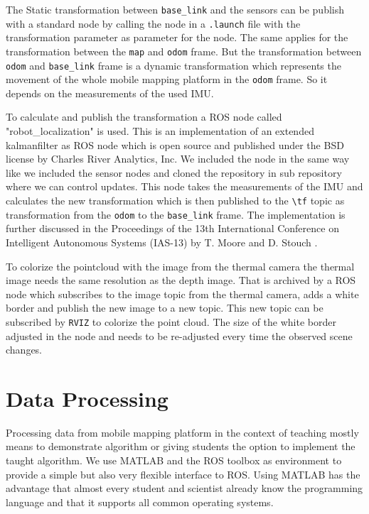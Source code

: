 The Static transformation between \texttt{base\_link} and the sensors can be publish with a standard node by calling the node in a \texttt{.launch} file with the transformation parameter as parameter for the node. 
The same applies for the transformation between the \texttt{map} and \texttt{odom} frame.
But the transformation between \texttt{odom} and \texttt{base\_link} frame is a dynamic transformation which represents the movement of the whole mobile mapping platform in the \texttt{odom} frame.
So it depends on the measurements of the used IMU\@.

To calculate and publish the transformation a ROS node called "robot\_localization" is used.
This is an implementation of an extended kalmanfilter as ROS node which is open source and published under the BSD license by Charles River Analytics, Inc.
We included the node in the same way like we included the sensor nodes and cloned the repository in sub repository where we can control updates.
This node takes the measurements of the IMU and calculates the new transformation which is then published to the \texttt{\textbackslash tf} topic as transformation from the \texttt{odom} to the \texttt{base\_link} frame.
The implementation is further discussed in the Proceedings of the 13th International Conference on Intelligent Autonomous Systems (IAS-13) by T. Moore and D. Stouch \cite{MooreStouchKeneralizedEkf2014}.

To colorize the pointcloud with the image from the thermal camera the thermal image needs the same resolution as the depth image.
That is archived by a ROS node which subscribes to the image topic from the thermal camera, adds a white border and publish the new image to a new topic.
This new topic can be subscribed by \texttt{RVIZ} to colorize the point cloud.
The size of the white border adjusted in the node and needs to be re-adjusted every time the observed scene changes.

\section{Data Processing}\label{ch:realization:sec:dataProcessing}

Processing data from mobile mapping platform in the context of teaching mostly means to demonstrate algorithm or giving students the option to implement the taught algorithm.
We use MATLAB and the ROS toolbox as environment to provide a simple but also very flexible interface to ROS.
Using MATLAB has the advantage that almost every student and scientist already know the programming language and that it supports all common operating systems.


